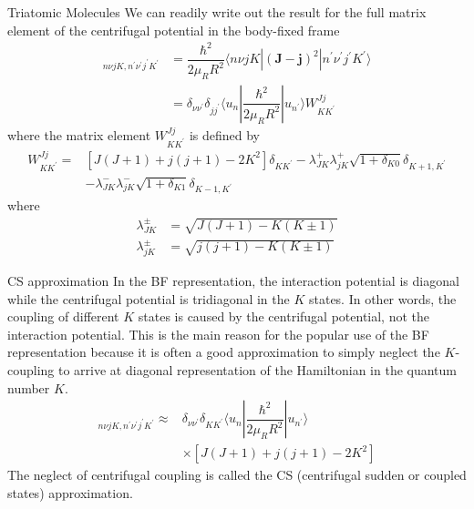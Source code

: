 \documentclass{beamer}
\begin{document}
	\begin{frame}{Triatomic Molecules}
		We can readily write out the result for the full matrix element of the centrifugal potential in the body-fixed frame
		\begin{align}
			[\mathbf{V_r^c}]_{n\nu jK,n^\prime\nu^\prime j^\prime K^\prime}&=\dfrac{\hbar^2}{2\mu_RR^2}\langle n\nu jK|(\mathbf{J}-\mathbf{j})^2|n^\prime\nu^\prime j^\prime K^\prime\rangle\nonumber\\
			&=\delta_{\nu\nu^\prime}\delta_{jj^\prime}\langle u_n|\dfrac{\hbar^2}{2\mu_RR^2}|u_{n^\prime}\rangle W_{KK^\prime}^{Jj}
		\end{align}
		where the matrix element $W_{KK^\prime}^{Jj}$ is defined by
		\begin{align}
			W_{KK^\prime}^{Jj}=&[J(J+1)+j(j+1)-2K^2]\delta_{KK^\prime}-\lambda^+_{JK}\lambda_{jK}^+\sqrt{1+\delta_{K0}}\delta_{K+1,K^\prime}\nonumber\\
			&-\lambda^-_{JK}\lambda_{jK}^-\sqrt{1+\delta_{K1}}\delta_{K-1,K^\prime}
			\label{W}
		\end{align}
		where
		\begin{align}
			\lambda^\pm_{JK}&=\sqrt{J(J+1)-K(K\pm1)}\\
			\lambda^\pm_{jK}&=\sqrt{j(j+1)-K(K\pm1)}
		\end{align}
	\end{frame}
	\begin{frame}{CS approximation}
		In the BF representation, the interaction potential is diagonal while the centrifugal potential is tridiagonal in the $K$ states. In other words, the coupling of different $K$ states is caused by the centrifugal potential, not the interaction potential. This is the main reason for the popular use of the BF representation because it is often a good approximation to simply neglect the $K$-coupling to arrive at diagonal representation of the Hamiltonian in the quantum number $K$.
		\begin{align}
			[\mathbf{V_r^c}]_{n\nu jK,n^\prime\nu^\prime j^\prime K^\prime}\approx&\delta_{\nu\nu^\prime}\delta_{KK^\prime}\langle u_n|\dfrac{\hbar^2}{2\mu_RR^2}|u_{n^\prime}\rangle\nonumber\\
			&\times[J(J+1)+j(j+1)-2K^2]
		\end{align}
		The neglect of centrifugal coupling is called the CS (centrifugal sudden or coupled states) approximation.
	\end{frame}
\end{document}
